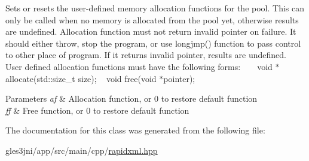 Sets or resets the user-\/defined memory allocation functions for the pool. This can only be called when no memory is allocated from the pool yet, otherwise results are undefined. Allocation function must not return invalid pointer on failure. It should either throw, stop the program, or use {\ttfamily longjmp()} function to pass control to other place of program. If it returns invalid pointer, results are undefined. ~\newline
~\newline
 User defined allocation functions must have the following forms\+: ~\newline
{\ttfamily  ~\newline
void $\ast$allocate(std\+::size\+\_\+t size); ~\newline
void free(void $\ast$pointer); }~\newline
 
\begin{DoxyParams}{Parameters}
{\em af} & Allocation function, or 0 to restore default function \\
\hline
{\em ff} & Free function, or 0 to restore default function \\
\hline
\end{DoxyParams}


The documentation for this class was generated from the following file\+:\begin{DoxyCompactItemize}
\item 
gles3jni/app/src/main/cpp/\hyperlink{rapidxml_8hpp}{rapidxml.\+hpp}\end{DoxyCompactItemize}
